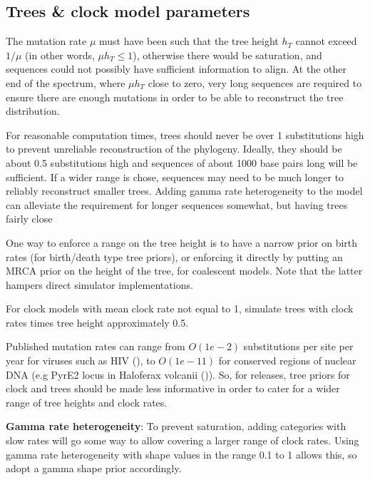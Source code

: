 \documentclass[oneside]{article}
\begin{document}
\subsection{Trees \& clock model
parameters}\label{trees-clock-model-parameters}

The mutation rate \(\mu\) must have been such that the tree height
\(h_T\) cannot exceed \(1/\mu\) (in other words, \(\mu h_T\le 1\)),
otherwise there would be saturation, and sequences could not possibly
have sufficient information to align. At the other end of the spectrum,
where \(\mu h_T\) close to zero, very long sequences are required to
ensure there are enough mutations in order to be able to reconstruct the
tree distribution.


For reasonable computation times, trees should never be over 1 substitutions high
to prevent unreliable reconstruction of the phylogeny. Ideally, they should
be about 0.5 substitutions high and sequences of about 1000 base pairs long will be
sufficient. If a wider range is chose,  sequences may need to be much longer to reliably 
reconstruct smaller trees. Adding gamma rate heterogeneity to the model can alleviate 
the requirement for longer sequences somewhat, but having trees fairly close 

One way to enforce a range on the tree height is to have
 a narrow prior on birth rates (for birth/death type tree priors), or enforcing 
 it directly by  putting an MRCA prior on the height of the tree, for coalescent
 models. Note that the latter hampers direct simulator implementations.

For clock models with mean clock rate not equal to 1, simulate trees with clock
rates times tree height approximately 0.5.

Published mutation rates can range from \(O(1e-2)\) substitutions per
site per year for viruses such as HIV (\cite{cuevas2015extremely}), to
\(O(1e-11)\) for conserved regions of nuclear DNA (e.g PyrE2 locus in
Haloferax volcanii (\cite{lynch2010evolution})). So, for releases, tree priors for clock
and trees should be made less informative in order to cater for a wider 
range of tree heights and clock rates.

{\bf Gamma rate heterogeneity}\label{gamma-rate-heterogeneity}:
To prevent saturation, adding categories with slow rates will go some
way to allow covering a larger range of clock rates. Using gamma rate
heterogeneity with shape values in the range 0.1 to 1 allows this, so
adopt a gamma shape prior accordingly.
\end{document}
